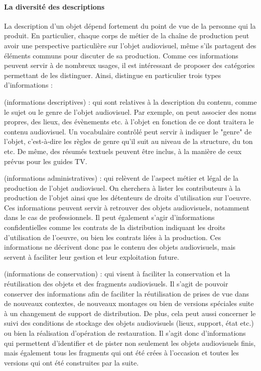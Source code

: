 \paragraph{La diversité des descriptions}
La description d'un objet dépend fortement du point de vue de la personne qui la produit. 
En particulier, chaque corps de métier de la chaîne de production peut avoir une perspective particulière sur l'objet audiovisuel, même s'ils partagent des éléments communs pour discuter de sa production. 
Comme ces informations peuvent servir à de nombreux usages, il est intéressant de proposer des catégories permettant de les distinguer. 
Ainsi, \cite[\S 2:Types of Metadata]{Austerberry2004} distingue en particulier trois types d'informations : 
\begin{liste}
	\item {} (informations descriptives) : qui sont relatives à la description du contenu, comme le sujet ou le genre de l'objet audiovisuel. 
	Par exemple, on peut associer des noms propres, des lieux, des évènements etc. à l'objet en fonction de ce dont traitera le contenu audiovisuel. 
	Un vocabulaire contrôlé peut servir à indiquer le "genre" de l'objet, c'est-à-dire les règles de genre qu'il suit au niveau de la structure, du ton etc.
	De même, des résumés textuels peuvent être inclus, à la manière de ceux prévus pour les guides TV. 

	\item {} (informations administratives) : qui relèvent de l'aspect métier et légal de la production de l'objet audiovisuel. 
	On cherchera à lister les contributeurs à la production de l'objet ainsi que les détenteurs de droits d'utilisation sur l'oeuvre. 
	Ces informations peuvent servir à retrouver des objets audiovisuels, notamment dans le cas de professionnels.
	Il peut également s'agir d'informations confidentielles comme les contrats de la distribution indiquant les droits d'utilisation de l'oeuvre, ou bien les contrats liées à la production. 
	Ces informations ne décrivent donc pas le contenu des objets audiovisuels, mais servent à faciliter leur gestion et leur exploitation future.

	\item {} (informations de conservation) : qui visent à faciliter la conservation et la réutilisation des objets et des fragments audiovisuels. 
	Il s'agit de pouvoir conserver des informations afin de faciliter la réutilisation de prises de vue dans de nouveaux contextes, de nouveaux montages ou bien de versions spéciales suite à un changement de support de distribution. 
	De plus, cela peut aussi concerner le suivi des conditions de stockage des objets audiovisuels (lieux, support, état etc.) ou bien la réalisation d'opération de restauration. 
	Il s'agit donc d'informations qui permettent d'identifier et de pister non seulement les objets audiovisuels finis, mais également tous les fragments qui ont été crées à l'occasion et toutes les versions qui ont été construites par la suite.
\end{liste}


